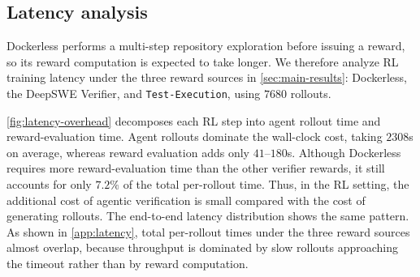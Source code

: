 \documentclass{llmxive}
\providecommand{\approach}{Dockerless\xspace}
\begin{document}

\subsection{Latency analysis}
\label{sec:latency-analysis}

\approach performs a multi-step repository exploration before issuing a reward, so its reward computation is expected to take longer.
We therefore analyze RL training latency under the three reward sources in \cref{sec:main-results}: \approach, the DeepSWE Verifier, and \texttt{Test-Execution}, using $7680$ rollouts.

\cref{fig:latency-overhead} decomposes each RL step into agent rollout time and reward-evaluation time.
Agent rollouts dominate the wall-clock cost, taking $2308$s on average, whereas reward evaluation adds only $41$--$180$s.
Although \approach requires more reward-evaluation time than the other verifier rewards, it still accounts for only $7.2\%$ of the total per-rollout time.
Thus, in the RL setting, the additional cost of agentic verification is small compared with the cost of generating rollouts.
The end-to-end latency distribution shows the same pattern.
As shown in \cref{app:latency}, total per-rollout times under the three reward sources almost overlap, because throughput is dominated by slow rollouts approaching the timeout rather than by reward computation.
\end{document}
